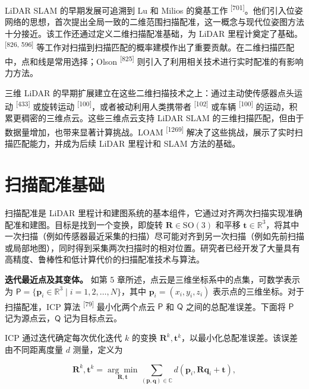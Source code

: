 LiDAR SLAM 的早期发展可追溯到 Lu 和 Milios 的奠基工作 \textsuperscript{[701]}。他们引入位姿网络的思想，首次提出全局一致的二维范围扫描配准，这一概念与现代位姿图方法十分接近。该工作还通过定义二维扫描配准基础，为 LiDAR 里程计奠定了基础。\textsuperscript{[826, 596]} 等工作对扫描到扫描匹配的概率建模作出了重要贡献。在二维扫描匹配中，点和线是常用选择；Olson \textsuperscript{[825]} 则引入了利用相关技术进行实时配准的有影响力方法。

三维 LiDAR 的早期扩展建立在这些二维扫描技术之上：通过主动使传感器点头运动 \textsuperscript{[433]} 或旋转运动 \textsuperscript{[100]}，或者被动利用人类携带者 \textsuperscript{[102]} 或车辆 \textsuperscript{[100]} 的运动，积累更稠密的三维点云。这些三维点云支持 LiDAR SLAM 的三维扫描匹配，但由于数据量增加，也带来显著计算挑战。LOAM \textsuperscript{[1269]} 解决了这些挑战，展示了实时扫描匹配能力，并成为后续 LiDAR 里程计和 SLAM 方法的基础。

\section{扫描配准基础}

扫描配准是 LiDAR 里程计和建图系统的基本组件，它通过对齐两次扫描实现准确配准和建图。目标是找到一个变换，即旋转 $\boldsymbol {R} \in \mathrm {SO}(3)$ 和平移 $\boldsymbol {t} \in \mathbb {R}^{3}$，将其中一次扫描（例如传感器最近采集的扫描）尽可能对齐到另一次扫描（例如先前扫描或局部地图），同时得到采集两次扫描时的相对位置。研究者已经开发了大量具有高精度、鲁棒性和低计算代价的扫描配准技术与算法。

\textbf{迭代最近点及其变体。} 如第 5 章所述，点云是三维坐标系中的点集，可数学表示为 $\mathsf { P } = \{ \pmb { p } _ { i } \in \mathbb { R } ^ { 3 } \mid i = 1, 2, \ldots, N \}$，其中 $\pmb { p } _ { i } = ( x _ { i } , y _ { i } , z _ { i } )$ 表示点的三维坐标。对于扫描配准，ICP 算法 \textsuperscript{[79]} 最小化两个点云 $\mathsf {P}$ 和 $\mathsf {Q}$ 之间的总配准误差。下面将 $\mathsf {P}$ 记为源点云，$\mathsf {Q}$ 记为目标点云。

ICP 通过迭代确定每次优化迭代 $k$ 的变换 $\boldsymbol {R}^{k}, \boldsymbol {t}^{k}$，以最小化总配准误差。该误差由不同距离度量 $d$ 测量，定义为

\begin{equation}
\boldsymbol {R} ^ {k}, \boldsymbol {t} ^ {k} = \underset {\boldsymbol {R}, \boldsymbol {t}} {\arg \min} \sum_ { (\boldsymbol {p}, \boldsymbol {q}) \in \mathbb {C} } d \left(\boldsymbol {p} _ {i}, \boldsymbol {R} \boldsymbol {q} _ {i} + \boldsymbol {t}\right),\tag{8.1}
\end{equation}

